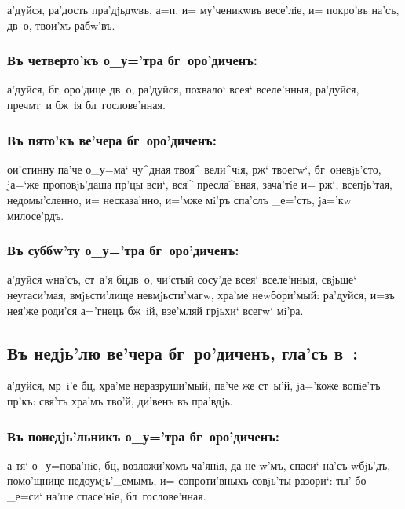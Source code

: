 \documentclass[14pt,twoside]{extreport}
\renewcommand{\*}{~~\raise3pt\hbox{\footnotesize*}}
\begin{document}
а'дуйся, ра'дость пра'дjьдwвъ, а=п, и= му'\-че\-ни\-кwвъ весе'лiе,
и= покро'въ на'съ, дв~о, твои'хъ рабw'въ.

\subsubsection{Въ четверто'къ о_у='тра бг~оро'диченъ:}

а'дуйся, бг~оро'дице дв~о, ра'дуйся, похвало` всея` все\-ле'н\-ныя,
ра'дуйся, преч мт~и бж~iя бл~го\-сло\-ве'н\-ная.

\subsubsection{Въ пято'къ ве'чера бг~оро'диченъ:}

ои'стинну па'че о_у=ма` чу^дная твоя^ вели^чiя, рж` твоегw`,
бг~оневjь'сто, jа=`же проповjь'даша пр'цы вси`, вся^ пресла^вная, зача'тiе
и= рж`, всепjь'тая, недомы'сленно, и= несказа'нно, и='мже мi'ръ спа'слъ
_е='сть, jа='кw милосе'рдъ.

\subsubsection{Въ суббw'ту о_у='тра бг~оро'диченъ:}

а'дуйся w\т на'съ, ст~а'я бц дв~о, чи'стый сосу'де всея`
вселе'нныя, свjьще` неугаси'мая, вмjьсти'лище не\-вмjь\-сти'\-ма\-гw, хра'ме
неwбори'мый: ра'дуйся, и=зъ нея'же роди'ся а='гнецъ бж~iй, взе'мляй грjьхи`
всегw` мi'ра.

\delimpict

\subsection[Гла'съ в~]{Въ недjь'лю ве'чера бг~ро'диченъ, гла'съ в~:}

а'дуйся, мр~i'е бц, хра'ме неразруши'мый, па'че же ст~ы'й, jа='коже
вопiе'тъ пр'къ: свя'тъ хра'мъ тво'й, ди'венъ въ пра'вдjь.

\subsubsection{Въ понедjь'льникъ о_у='тра бг~оро'диченъ:}

а тя` о_у=пова'нiе, бц, возложи'хомъ ча'янiя, да не w'мъ,
спаси` на'съ w\т бjь'дъ, помо'щнице недоумjь'_емымъ, и= сопроти'вныхъ совjь'ты
разори`: ты' бо _е=си` на'ше спасе'нiе, бл~гослове'нная.
\end{document}
